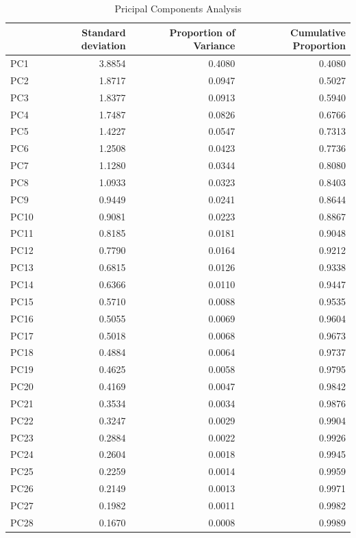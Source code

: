 \documentclass[
  letterpaper,
  DIV=11,
  numbers=noendperiod]{scrreprt}
\begin{document}
\begin{table}

\caption{Pricipal Components Analysis}
\centering
\begin{tabular}[t]{l|r|r|r}
\hline
  & Standard deviation & Proportion of Variance & Cumulative Proportion\\
\hline
PC1 & 3.8854 & 0.4080 & 0.4080\\
\hline
PC2 & 1.8717 & 0.0947 & 0.5027\\
\hline
PC3 & 1.8377 & 0.0913 & 0.5940\\
\hline
PC4 & 1.7487 & 0.0826 & 0.6766\\
\hline
PC5 & 1.4227 & 0.0547 & 0.7313\\
\hline
PC6 & 1.2508 & 0.0423 & 0.7736\\
\hline
PC7 & 1.1280 & 0.0344 & 0.8080\\
\hline
PC8 & 1.0933 & 0.0323 & 0.8403\\
\hline
PC9 & 0.9449 & 0.0241 & 0.8644\\
\hline
PC10 & 0.9081 & 0.0223 & 0.8867\\
\hline
PC11 & 0.8185 & 0.0181 & 0.9048\\
\hline
PC12 & 0.7790 & 0.0164 & 0.9212\\
\hline
PC13 & 0.6815 & 0.0126 & 0.9338\\
\hline
PC14 & 0.6366 & 0.0110 & 0.9447\\
\hline
PC15 & 0.5710 & 0.0088 & 0.9535\\
\hline
PC16 & 0.5055 & 0.0069 & 0.9604\\
\hline
PC17 & 0.5018 & 0.0068 & 0.9673\\
\hline
PC18 & 0.4884 & 0.0064 & 0.9737\\
\hline
PC19 & 0.4625 & 0.0058 & 0.9795\\
\hline
PC20 & 0.4169 & 0.0047 & 0.9842\\
\hline
PC21 & 0.3534 & 0.0034 & 0.9876\\
\hline
PC22 & 0.3247 & 0.0029 & 0.9904\\
\hline
PC23 & 0.2884 & 0.0022 & 0.9926\\
\hline
PC24 & 0.2604 & 0.0018 & 0.9945\\
\hline
PC25 & 0.2259 & 0.0014 & 0.9959\\
\hline
PC26 & 0.2149 & 0.0013 & 0.9971\\
\hline
PC27 & 0.1982 & 0.0011 & 0.9982\\
\hline
PC28 & 0.1670 & 0.0008 & 0.9989\\
\hline

\end{tabular}
\end{table}
\end{document}
